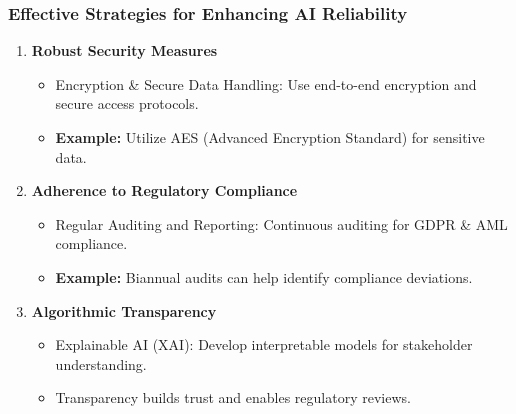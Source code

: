\documentclass[aspectratio=169]{beamer}
\begin{document}
\begin{frame}[fragile]
    \frametitle{Effective Strategies for Enhancing AI Reliability}
    \begin{enumerate}
        \item \textbf{Robust Security Measures}
            \begin{itemize}
                \item Encryption \& Secure Data Handling: Use end-to-end encryption and secure access protocols. 
                \item \textbf{Example:} Utilize AES (Advanced Encryption Standard) for sensitive data.
            \end{itemize}
        \item \textbf{Adherence to Regulatory Compliance}
            \begin{itemize}
                \item Regular Auditing and Reporting: Continuous auditing for GDPR \& AML compliance.
                \item \textbf{Example:} Biannual audits can help identify compliance deviations.
            \end{itemize}
        \item \textbf{Algorithmic Transparency}
            \begin{itemize}
                \item Explainable AI (XAI): Develop interpretable models for stakeholder understanding. 
                \item Transparency builds trust and enables regulatory reviews.
            \end{itemize}
    \end{enumerate}
\end{frame}
\end{document}
